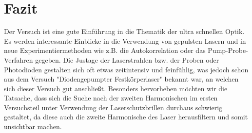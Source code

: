 \chapter{Fazit}

Der Versuch ist eine gute Einführung in die Thematik der ultra schnellen Optik. Es werden interessante Einblicke in die Verwendung von gepulsten Lasern und in neue Experimentiermethoden wie z.B. die Autokorrelation oder das Pump-Probe-Verfahren gegeben. Die Justage der Laserstrahlen bzw. der Proben oder Photodioden gestalten sich oft etwas zeitintensiv und feinfühlig, was jedoch schon aus dem Versuch "Diodengepumpter Festkörperlaser"{} bekannt war, an welchen sich dieser Versuch gut anschließt. Besonders hervorheben möchten wir die Tatsache, dass sich die Suche nach der zweiten Harmonischen im ersten Versuchsteil unter Verwendung der Laserschutzbrillen durchaus schwierig gestaltet, da diese auch die zweite Harmonische des Laser herausfiltern und somit unsichtbar machen. 
	
